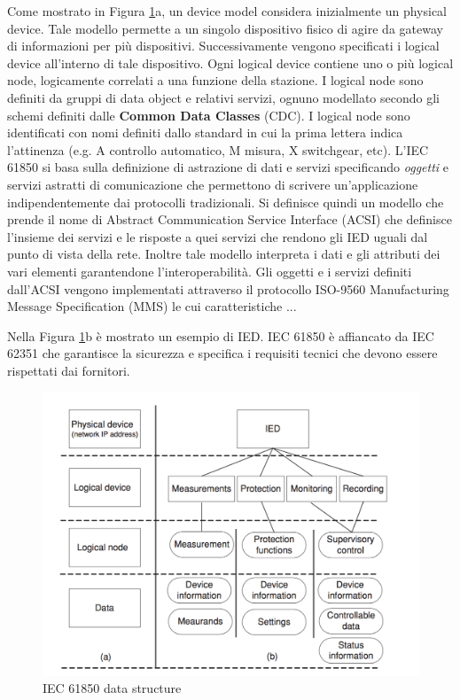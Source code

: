 Come mostrato in Figura \ref{fig:iec61850ds}a, un device model considera inizialmente un physical device. Tale modello permette a un singolo dispositivo fisico di agire da gateway di informazioni per più dispositivi. Successivamente vengono specificati i logical device all'interno di tale dispositivo. Ogni logical device contiene uno o più logical node, logicamente correlati a una funzione della stazione. I logical node sono definiti da gruppi di data object e relativi servizi, ognuno modellato secondo gli schemi definiti dalle \textbf{Common Data Classes} (CDC). I logical node sono identificati con nomi definiti dallo standard in cui la prima lettera indica l'attinenza (e.g. A controllo automatico, M misura, X switchgear, etc). L'IEC 61850 si basa sulla definizione di astrazione di dati e servizi specificando \emph{oggetti} e {servizi astratti} di comunicazione che permettono di scrivere un'applicazione indipendentemente dai protocolli tradizionali. Si definisce quindi un modello che prende il nome di Abstract Communication Service Interface (ACSI) che definisce l'insieme dei servizi e le risposte a quei servizi che rendono gli IED uguali dal punto di vista della rete. Inoltre tale modello interpreta i dati e gli attributi dei vari elementi garantendone l'interoperabilità. Gli oggetti e i servizi definiti dall'ACSI vengono implementati attraverso il protocollo ISO-9560 Manufacturing Message Specification (MMS) le cui caratteristiche ...

Nella Figura \ref{fig:iec61850ds}b è mostrato un esempio di IED. IEC 61850 è affiancato da IEC 62351 che garantisce la sicurezza e specifica i requisiti tecnici che devono essere rispettati dai fornitori.
\begin{figure}[h]
	\centering
	\includegraphics[scale=0.350]{imgs/iec61850ds.png}
	\caption{IEC 61850 data structure} \label{fig:iec61850ds}
\end{figure}\newpage
